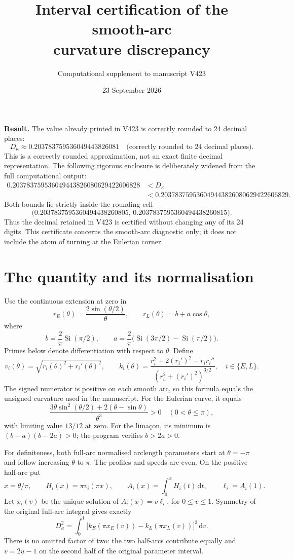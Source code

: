 \documentclass[10pt,a4paper]{article}
\title{Interval certification of the smooth-arc\\curvature discrepancy}
\author{Computational supplement to manuscript V423}
\date{23 September 2026}
\newcommand{\dd}{\,\mathrm d}
\newcommand{\Si}{\operatorname{Si}}
\begin{document}
\maketitle

\textbf{Result.} The value already printed in V423 is correctly rounded to
24 decimal places:
\[
\boxed{D_\kappa\approx0.203783759536049443826081
       \quad\text{(correctly rounded to 24 decimal places).}}
\]
This is a correctly rounded approximation, not an exact finite decimal representation. The following rigorous enclosure is deliberately widened from
the full computational output:
\begin{equation}\label{eq:enclosure}
\begin{split}
0.203783759536049443826080629422606828
&<D_\kappa\\
&<0.203783759536049443826080629422606829.
\end{split}
\end{equation}
Both bounds lie strictly inside the rounding cell
\[
\bigl(
0.2037837595360494438260805,\,
0.2037837595360494438260815
\bigr).
\]
Thus the decimal retained in V423 is certified
without changing any of its 24 digits. This certificate concerns the smooth-arc
diagnostic only; it does not include the atom of turning at the Eulerian corner.

\section{The quantity and its normalisation}
Use the continuous extension at zero in
\[
r_E(\theta)=\frac{2\sin(\theta/2)}{\theta},\qquad
r_L(\theta)=b+a\cos\theta,
\]
where
\[
b=\frac{2}{\pi}\Si(\pi/2),\qquad
a=\frac{2}{\pi}\bigl(\Si(3\pi/2)-\Si(\pi/2)\bigr).
\]
Primes below denote differentiation with respect to \(\theta\). Define
\[
v_i(\theta)=\sqrt{r_i(\theta)^2+r_i'(\theta)^2},\qquad
k_i(\theta)=
\frac{r_i^2+2(r_i')^2-r_i r_i''}
     {(r_i^2+(r_i')^2)^{3/2}},
\quad i\in\{E,L\}.
\]
The signed numerator is positive on each smooth arc, so this formula equals the
unsigned curvature used in the manuscript. For the Eulerian curve, it equals
\[
\frac{3\theta\sin^2(\theta/2)+2(\theta-\sin\theta)}{\theta^3}>0
\quad(0<\theta\leq\pi),
\]
with limiting value \(13/12\) at zero. For the lima\c{c}on, its minimum is
\((b-a)(b-2a)>0\); the program verifies \(b>2a>0\).

For definiteness, both full-arc normalised arclength parameters start at
\(\theta=-\pi\) and follow increasing \(\theta\) to \(\pi\).
The profiles and speeds are even. On the positive half-arc put
\[
x=\theta/\pi,\qquad H_i(x)=\pi v_i(\pi x),\qquad
A_i(x)=\int_0^x H_i(t)\dd t,\qquad \ell_i=A_i(1).
\]
Let \(x_i(v)\) be the unique solution of \(A_i(x)=v\ell_i\), for
\(0\leq v\leq1\). Symmetry of the original full-arc integral gives exactly
\begin{equation}\label{eq:reduced}
D_\kappa^2=\int_0^1
\bigl[k_E(\pi x_E(v))-k_L(\pi x_L(v))\bigr]^2\dd v.
\end{equation}
There is no omitted factor of two: the two half-arcs contribute equally and
\(v=2u-1\) on the second half of the original parameter interval.
\end{document}
